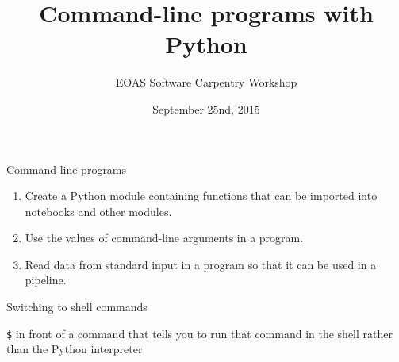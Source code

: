 \documentclass{beamer}
\title[Command line Python]{Command-line programs with Python}
\subtitle[]{EOAS Software Carpentry Workshop }
\date[Sep 2015]{September 25nd, 2015}
\begin{document}





 
\begin{frame}[plain]
  
\titlepage


\end{frame}



\begin{frame}{Command-line programs}

\begin{enumerate}
    \item{Create a Python module containing functions that can be imported into notebooks and other modules.}
    \item{Use the values of command-line arguments in a program.}
    \item{Read data from standard input in a program so that it can be used in a pipeline.}
\end{enumerate}
\end{frame}



\begin{frame}{Switching to shell commands}

 \textcolor{verde}{\texttt{\$}} in front of a command that tells you to run that command in the shell rather than the Python interpreter
%

\end{frame}

\end{document}
